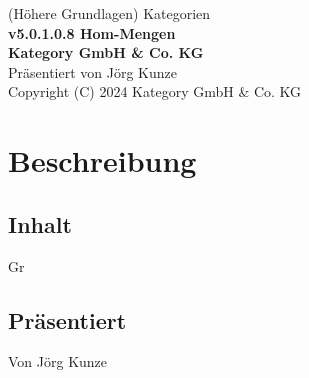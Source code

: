 \documentclass[a4paper]{amsart}
\theoremstyle{definition}
\begin{document}
\begin{titlepage}
\centering
{\huge
(Höhere Grundlagen) Kategorien\\[1cm]
\textbf{v5.0.1.0.8 Hom-Mengen}
}\\[1cm]

\textbf{Kategory GmbH \& Co. KG}\\
Präsentiert von Jörg Kunze\\
Copyright (C) 2024 Kategory GmbH \& Co. KG

\end{titlepage}

%

\newpage

\section*{Beschreibung}

\subsection*{Inhalt}
Gr

\subsection*{Präsentiert}
Von Jörg Kunze
\end{document}
